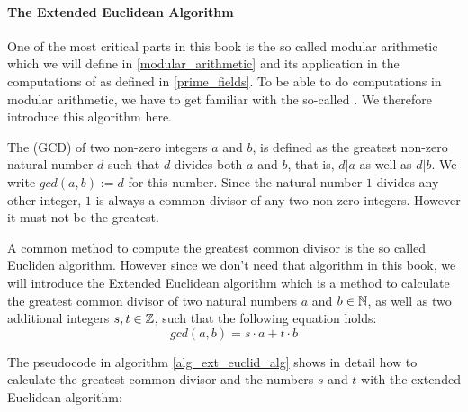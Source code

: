 \paragraph{The Extended Euclidean Algorithm}
One of the most critical parts in this book is the so called modular arithmetic which we will define in \ref{modular_arithmetic} and its application in the computations of  as defined in \ref{prime_fields}. To be able to do computations in modular arithmetic, we have to get familiar with the so-called . We therefore introduce this algorithm here.

The  (GCD) of two non-zero integers $a$ and $b$, is defined as the greatest non-zero natural number $d$ such that $d$ divides both $a$ and $b$, that is, $d|a$ as well as $d|b$. We write $ gcd (a, b):=d $ for this number. Since the natural number $1$ divides any other integer, $1$ is always a common divisor of any two non-zero integers. However it must not be the greatest.

A common method to compute the greatest common divisor is the so called Eucliden algorithm. However since we don't need that algorithm in this book, we will introduce the Extended Euclidean algorithm which is a method to calculate the greatest common divisor of two natural numbers $ a $ and $ b \in \mathbb{N} $, as well as two additional integers $ s, t \in \mathbb{Z} $, such that the following equation holds:
\begin{equation}
\label{eq: erw_Eukl_algo}
gcd (a, b) = s \cdot a + t \cdot b
\end{equation}

The pseudocode in algorithm \ref{alg_ext_euclid_alg} shows in detail how to calculate the greatest common divisor and the numbers $s$ and $t$ with the extended Euclidean algorithm:

